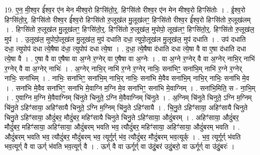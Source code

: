 \documentclass[17pt]{extarticle}
\begin{document}
19. ए॒न॒ मी॒श्व॒र ई᳚श्व॒र ए॑न मेन मीश्व॒रो हिꣳसि॑तो॒र्॒. हिꣳसि॑तो रीश्व॒र ए॑न मेन मीश्व॒रो हिꣳसि॑तोः । . ई॒श्व॒रो हिꣳसि॑तो॒र्॒. हिꣳसि॑तो रीश्व॒र ई᳚श्व॒रो हिꣳसि॑तो रु॒लूख॑ल मु॒लूख॑लꣳ॒॒ हिꣳसि॑तो रीश्व॒र ई᳚श्व॒रो हिꣳसि॑तो रु॒लूख॑लम् । . हिꣳसि॑तो रु॒लूख॑ल मु॒लूख॑लꣳ॒॒ हिꣳसि॑तो॒र्॒. हिꣳसि॑तो रु॒लूख॑ल॒ मुपोपो॒ लूख॑लꣳ॒॒ हिꣳसि॑तो॒र्॒. हिꣳसि॑तो रु॒लूख॑ल॒ मुप॑ । . उ॒लूख॑ल॒ मुपोपो॒लूख॑ल मु॒लूख॑ल॒ मुप॑ दधाति दधा॒ त्युपो॒लूख॑ल मु॒लूख॑ल॒ मुप॑ दधाति । . उप॑ दधाति दधा॒ त्युपोप॑ दधा त्ये॒षैषा द॑धा॒ त्युपोप॑ दधा त्ये॒षा । . द॒धा॒ त्ये॒षैषा द॑धाति दधा त्ये॒षा वै वा ए॒षा द॑धाति दधा त्ये॒षा वै । . ए॒षा वै वा ए॒षैषा वा अ॒ग्ने र॒ग्नेर् वा ए॒षैषा वा अ॒ग्नेः । . वा अ॒ग्ने र॒ग्नेर् वै वा अ॒ग्नेर् नाभि॒र् नाभि॑ र॒ग्नेर् वै वा अ॒ग्नेर् नाभिः॑ । . अ॒ग्नेर् नाभि॒र् नाभि॑ र॒ग्ने र॒ग्नेर् नाभिः॒ सना॑भिꣳ॒॒ सना॑भि॒म् नाभि॑ र॒ग्ने र॒ग्नेर् नाभिः॒ सना॑भिम् । . नाभिः॒ सना॑भिꣳ॒॒ सना॑भि॒म् नाभि॒र् नाभिः॒ सना॑भि मे॒वैव सना॑भि॒म् नाभि॒र् नाभिः॒ सना॑भि मे॒व । . सना॑भि मे॒वैव सना॑भिꣳ॒॒ सना॑भि मे॒वाग्नि म॒ग्नि मे॒व सना॑भिꣳ॒॒ सना॑भि मे॒वाग्निम् । . सना॑भि॒मिति॒ स - ना॒भि॒म् । . ए॒वाग्नि म॒ग्नि मे॒वैवाग्निम् चि॑नुते चिनुते॒ ऽग्नि मे॒वैवाग्निम् चि॑नुते । . अ॒ग्निम् चि॑नुते चिनुते॒ ऽग्नि म॒ग्निम् चि॑नु॒ते ऽहिꣳ॑साया॒ अहिꣳ॑सायै चिनुते॒ ऽग्नि म॒ग्निम् चि॑नु॒ते ऽहिꣳ॑सायै । . चि॒नु॒ते ऽहिꣳ॑साया॒ अहिꣳ॑सायै चिनुते चिनु॒ते ऽहिꣳ॑साया॒ औदुं॑बर॒ मौदुं॑बर॒ महिꣳ॑सायै चिनुते चिनु॒ते ऽहिꣳ॑साया॒ औदुं॑बरम् । . अहिꣳ॑साया॒ औदुं॑बर॒ मौदुं॑बर॒ महिꣳ॑साया॒ अहिꣳ॑साया॒ औदुं॑बरम् भवति भव॒ त्यौदुं॑बर॒ महिꣳ॑साया॒ अहिꣳ॑साया॒ औदुं॑बरम् भवति । . औदुं॑बरम् भवति भव॒ त्यौदुं॑बर॒ मौदुं॑बरम् भव॒ त्यूर्गूर्ग् भ॑व॒ त्यौदुं॑बर॒ मौदुं॑बरम् भव॒त्यूर्क् । . भ॒व॒ त्यूर्गूर्ग् भ॑वति भव॒त्यूर्ग् वै वा ऊर्ग् भ॑वति भव॒त्यूर्ग् वै । . ऊर्ग् वै वा ऊर्गूर्ग् वा उ॑दुं॒बर॑ उदुं॒बरो॒ वा ऊर्गूर्ग् वा उ॑दुं॒बरः॑ । \newline
\end{document}
